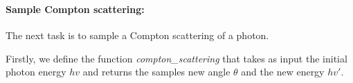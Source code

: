 \documentclass[11pt]{article}
\begin{document}
    \begin{center}
    \end{center}
    { \hspace*{\fill} \\}
    
    \begin{center}
    \end{center}
    { \hspace*{\fill} \\}
    
    \begin{center}
    \end{center}
    { \hspace*{\fill} \\}
    
    \begin{center}
    \end{center}
    { \hspace*{\fill} \\}
    
    \paragraph{Sample Compton scattering:}\label{sample-compton-scattering}

The next task is to sample a Compton scattering of a photon.

Firstly, we define the function \emph{compton\_scattering} that takes as
input the initial photon energy \(hv\) and returns the samples new angle
\(\theta\) and the new energy \(hv'\).
\end{document}

